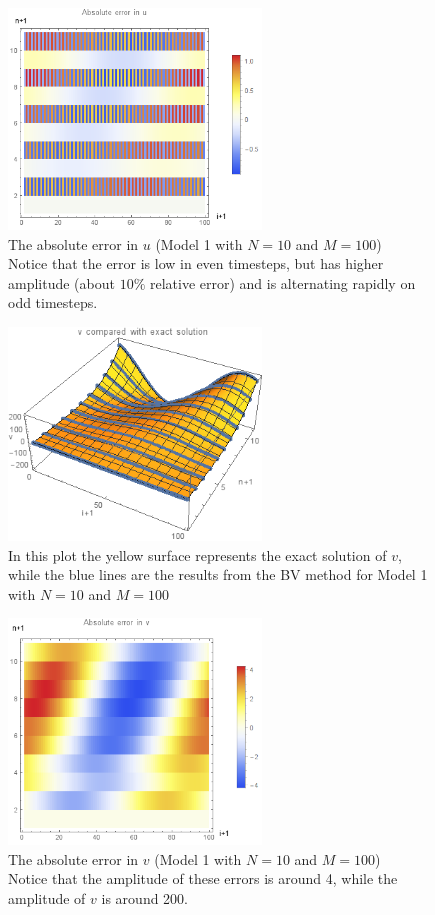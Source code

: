 \documentclass{article}
\renewcommand{\(}{\left(}
\renewcommand{\)}{\right)}
\begin{document}
\begin{figure}
\centering
\includegraphics[width=0.6\textwidth]{errorUneat.png}
\caption{The absolute error in $u$ (Model 1 with $N=10$ and $M=100$)\\Notice that the error is low in even timesteps, but has higher amplitude (about $10\%$ relative error) and is alternating rapidly on odd timesteps.}
\label{fig:uerr1}
\end{figure}

\begin{figure}
\centering
\includegraphics[width=0.6\textwidth]{vCompared.png}
\caption{In this plot the yellow surface represents the exact solution of $v$, while the blue lines are the results from the BV method for Model 1 with $N=10$ and $M=100$}
\label{fig:vcomp1}
\end{figure}

\begin{figure}
\centering
\includegraphics[width=0.6\textwidth]{errorVneat.png}
\caption{The absolute error in $v$ (Model 1 with $N=10$ and $M=100$)\\Notice that the amplitude of these errors is around 4, while the amplitude of $v$ is around 200. }
\label{fig:verr1}
\end{figure}
\end{document}
